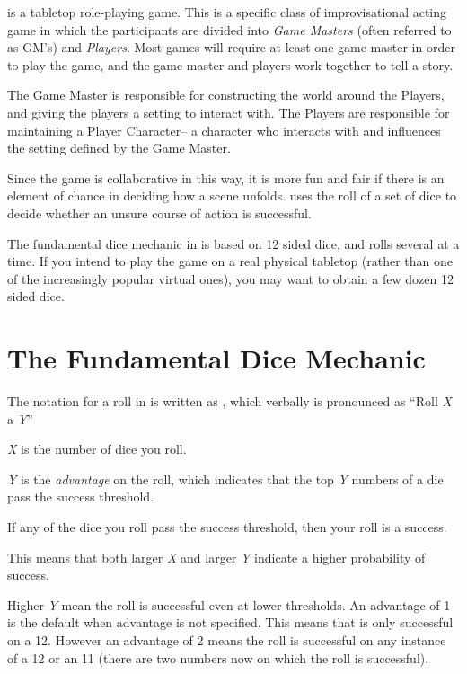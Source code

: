 
\GammaRP{} is a tabletop role-playing game. This is a specific class of improvisational acting game in which the participants are divided into \emph{Game Masters} (often referred to as GM's) and \emph{Players}. Most games will require at least one game master in order to play the game, and the game master and players work together to tell a story.

The Game Master is responsible for constructing the world around the Players, and giving the players a setting to interact with. The Players are responsible for maintaining a Player Character-- a character who interacts with and influences the setting defined by the Game Master. 

Since the game is collaborative in this way, it is more fun and fair if there is an element of chance in deciding how a scene unfolds. \GammaRP{} uses the roll of a set of dice to decide whether an unsure course of action is successful.

\GRPbitepar{0mm,1mm,12mm,13mm,13mm,8mm}
The fundamental dice mechanic in \GammaRP{} is based on 12 sided dice, and rolls several at a time. If you intend to play the game on a real physical tabletop (rather than one of the increasingly popular virtual ones), you may want to obtain a few dozen 12 sided dice.

\section{The Fundamental Dice Mechanic}

The notation for a roll in \GammaRP{} is written as , which verbally is pronounced as ``Roll \textit{X} a \textit{Y}''

\textit{X} is the number of dice you roll.

\textit{Y} is the \emph{advantage} on the roll, which indicates that the top \textit{Y} numbers of a die pass the success threshold.

If any of the dice you roll pass the success threshold, then your roll is a success.

This means that both larger \textit{X} and larger \textit{Y} indicate a higher probability of success.

\GRPbitepar[right]{0pt,0pt,0pt,0pt,8.9mm,10.5mm,9.5mm}
Higher \textit{Y} mean the roll is successful even at lower thresholds. An advantage of 1 is the default when advantage is not specified. This means that is only successful on a 12. However an advantage of 2 means the roll is successful on any instance of a 12 or an 11 (there are two numbers now on which the roll is successful).

